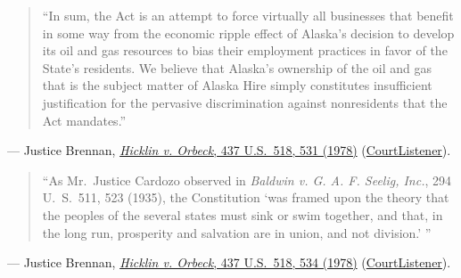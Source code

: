 \documentclass[12pt]{article}
\begin{document}
\begin{quote}
``In sum, the Act is an attempt to force virtually all businesses that benefit in some way from the economic ripple effect of Alaska's decision to develop its oil and gas resources to bias their employment practices in favor of the State's residents. We believe that Alaska's ownership of the oil and gas that is the subject matter of Alaska Hire simply constitutes insufficient justification for the pervasive discrimination against nonresidents that the Act mandates.''
\end{quote}
\noindent --- Justice Brennan, \href{https://supreme.justia.com/cases/federal/us/437/518/}{\textit{Hicklin v. Orbeck}, 437 U.S.\ 518, 531 (1978)} (\href{https://www.courtlistener.com/opinion/109911/hicklin-v-orbeck/}{CourtListener}).

\begin{quote}
``As Mr.\ Justice Cardozo observed in \textit{Baldwin v. G. A. F. Seelig, Inc.}, 294 U.\ S.\ 511, 523 (1935), the Constitution `was framed upon the theory that the peoples of the several states must sink or swim together, and that, in the long run, prosperity and salvation are in union, and not division.' ''
\end{quote}
\noindent --- Justice Brennan, \href{https://supreme.justia.com/cases/federal/us/437/518/}{\textit{Hicklin v. Orbeck}, 437 U.S.\ 518, 534 (1978)} (\href{https://www.courtlistener.com/opinion/109911/hicklin-v-orbeck/}{CourtListener}).
\end{document}
